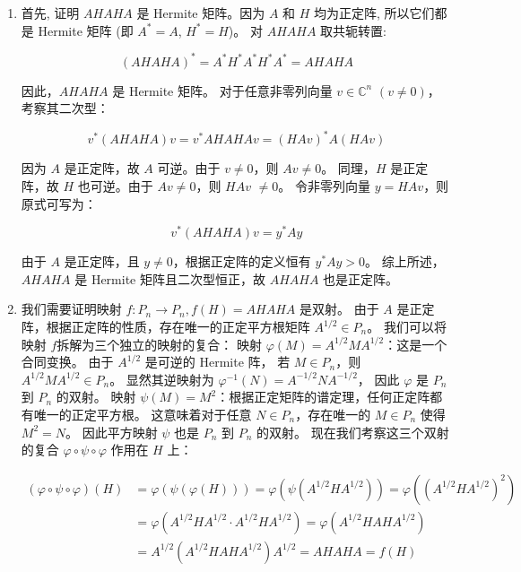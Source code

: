 \begin{enumerate}
\item
  首先, 证明 $AHAHA$ 是 Hermite 矩阵。因为 \(A\) 和 \(H\) 均为正定阵,
  所以它们都是 Hermite 矩阵 (即 \(A^{*} = A\), \(H^{*} = H\))。
  对 $AHAHA$ 取共轭转置:

\[(A H A H A) ^ {*} = A ^ {*} H ^ {*} A ^ {*} H ^ {*} A ^ {*} = A H A H A\]

因此，$AHAHA$ 是 Hermite 矩阵。
对于任意非零列向量 \(v \in \mathbb{C}^{n}\) \((v \neq 0)\)，考察其二次型：

\[v ^ {*} (A H A H A) v = v ^ {*} A H A H A v = (H A v) ^ {*} A (H A v)\]

因为 $A$ 是正定阵，故 $A$ 可逆。由于 \(v \neq 0\)，则 \(Av \neq 0\)。
同理，$H$ 是正定阵，故 $H$ 也可逆。由于 \(Av \neq 0\)，则 $HAv$ \(\neq 0\)。
令非零列向量 $y = HAv$，则原式可写为：

\[v ^ {*} (A H A H A) v = y ^ {*} A y\]

由于 $A$ 是正定阵，且 \(y \neq 0\)，根据正定阵的定义恒有 \(y^{*}Ay > 0\)。
综上所述，$AHAHA$ 是 Hermite 矩阵且二次型恒正，故 $AHAHA$ 也是正定阵。

\item
  我们需要证明映射 \(f: P_n \to P_n, f(H) = AHAHA\) 是双射。
  由于 \(A\) 是正定阵，根据正定阵的性质，存在唯一的正定平方根矩阵 \(A^{1/2} \in P_n\)。
  我们可以将映射 \(f\)拆解为三个独立的映射的复合：
  映射 \(\varphi(M) = A^{1/2}MA^{1/2}\)：这是一个合同变换。
  由于 \(A^{1/2}\) 是可逆的 Hermite 阵，
  若 \(M \in P_n\)，则 \(A^{1/2}MA^{1/2} \in P_n\)。
  显然其逆映射为 \(\varphi^{-1}(N) = A^{-1/2}NA^{-1/2}\)，
  因此 \(\varphi\) 是 \(P_n\) 到 \(P_n\) 的双射。
  映射 \(\psi(M) = M^2\)：根据正定矩阵的谱定理，任何正定阵都有唯一的正定平方根。
  这意味着对于任意 \(N \in P_n\)，存在唯一的 \(M \in P_n\) 使得 \(M^{2}=N\)。
  因此平方映射 \(\psi\) 也是 \(P_{n}\) 到 \(P_{n}\) 的双射。
  现在我们考察这三个双射的复合 \(\varphi\circ\psi\circ\varphi\) 作用在 $H$ 上：

\begin{align*}
    (\varphi \circ \psi \circ \varphi) (H) 
    & = \varphi (\psi (\varphi (H))) 
    = \varphi (\psi (A^{1/2} H A^{1/2})) 
    = \varphi ((A^{1/2} H A^{1/2})^{2}) \\
    & = \varphi (A^{1/2} H A^{1/2} \cdot A^{1/2} H A^{1/2}) 
    = \varphi (A^{1/2} H A H A^{1/2}) \\
    & = A^{1/2} (A^{1/2} H A H A^{1/2}) A^{1/2} 
    = A H A H A = f (H)
\end{align*}


\end{enumerate}
